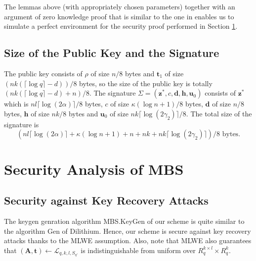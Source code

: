 \documentclass[conference]{IEEEtran}
\newtheorem{lemma}[theorem]{Lemma}
\begin{document}
	The lemmas above (with appropriately chosen parameters) together with an argument of zero knowledge proof that is similar to the one in \cite[Appendix B]{DKL+19} enables us to simulate a perfect environment for the security proof performed in Section \ref{sec5}.
	\iffalse
	
	\begin{lemma}[Lemma 5.2 in \cite{Lyu12}] \label{lem4}
		Given a matrix $\mathbf{A} \in \mathbb{Z}_q^{n \times m}$ where $m>64+n\log q/\log(2d+1)$, randomly chosen $\mathbf{s} \leftarrow \{-d, \cdots, 0, \cdots, d\}^m$. Then with probability at least $1-2^{-100}$, there exists another $\mathbf{s}' \leftarrow \{-d, \cdots, 0, \cdots, d\}^m$ such that $\mathbf{A}\mathbf{s}=\mathbf{A}\mathbf{s}' \text{(mod } q).$
	\end{lemma}
	
	\fi
	
	
	\subsection{Size of the Public Key and the Signature} 
	
	The public key consists of $\rho$ of size $n/8$ bytes and $\mathbf{t}_1$ of size $(nk(\lceil \log q\rceil-d))/8$ bytes, so the size of the public key is totally $(nk(\lceil \log q\rceil-d)+n)/8$.
	The signature $ \Sigma=(\mathbf{z}^*, c, \mathbf{d}, \mathbf{h}, \mathbf{u}_0)$ consists of $\mathbf{z}^*$ which is $nl \lceil \log (2\alpha) \rceil /8$ bytes, $c$ of size $\kappa(\log n+1)/8$ bytes, $\mathbf{d}$ of size $n/8$ bytes, $\mathbf{h}$ of size $nk/8$ bytes and $\mathbf{u}_0$ of size $nk\lceil \log(2\gamma_2)\rceil/8$. The total size of the signature is $$(nl \lceil \log (2\alpha) \rceil +\kappa(\log n+1)+n+nk+nk\lceil \log(2\gamma_2)\rceil)/8 \text{ bytes}.$$
	
	\section{Security Analysis of \textsf{MBS}}  \label{sec5}
	
	\subsection{Security against Key Recovery Attacks}
	
	The keygen genration algorithm \textsf{MBS.KeyGen} of our scheme is quite similar to the algorithm \textsf{Gen} of \textsf{Dilithium}. Hence, our scheme is secure against key recovery attacks thanks to the \textsf{MLWE} assumption. Also, note that \textsf{MLWE} also guarantees that $(\mathbf{A},\mathbf{t}) \leftarrow \mathcal{L}_{q,k,l, S_{\eta'}}$ is indistinguishable from uniform over $R_q^{k\times l} \times R_q^{k}.$
\end{document}
